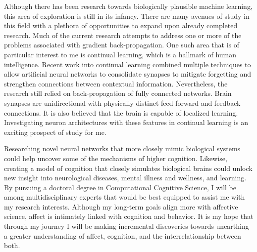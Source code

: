 \documentclass[12pt]{article}
\begin{document}
Although there has been research towards biologically plausible machine
learning, this area of exploration is still in its infancy.  There are many
avenues of study in this field with a plethora of opportunities to expand upon
already completed research.  Much of the current research attempts to address
one or more of the problems associated with gradient back-propagation. One such
area that is of particular interest to me is continual learning, which is a
hallmark of human intelligence.  Recent work into continual learning combined
multiple techniques to allow artificial neural networks to consolidate synapses
to mitigate forgetting and strengthen connections between contextual
information.  Nevertheless, the research still relied on back-propagation of
fully connected networks.  Brain synapses are unidirectional with physically
distinct feed-forward and feedback connections. It is also believed that the
brain is capable of localized learning. Investigating neuron architectures with
these features in continual learning is an exciting prospect of study for me.

Researching novel neural networks that more closely mimic biological systems could
help uncover some of the mechanisms of higher cognition.  Likewise, creating a model of
cognition that closely simulates biological brains could unlock new insight into
neurological diseases, mental illness and wellness, and learning.  By pursuing a
doctoral degree in Computational Cognitive Science, I will be among
multidisciplinary experts that would be best equipped to assist me with my
research interests.  Although my long-term goals align more with affective
science, affect is intimately linked with cognition and behavior.  It is my hope
that through my journey I will be making incremental discoveries towards
unearthing a greater understanding of affect, cognition, and the
interrelationship between both.
\end{document}
